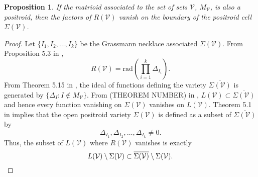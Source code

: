 \documentclass[11pt]{article}
\newcommand{\note}{\todo[color=green!40]}
\newcommand{\cP}{\mathcal{P}}
\newcommand{\cV}{\mathcal{V}}
\newcommand{\VP}{\cV(\cP)}
\newtheorem{prop}[thm]{Proposition}
\theoremstyle{remark}
\theoremstyle{definition}
\begin{document}
\begin{prop}\label{res:vanishonbdny} \note{changed all $\VP$ to $\cV$}
If the matrioid associated to the set of sets $\cV$, $M_{\cV}$, is also a positroid, then the factors of $R(\cV)$ vanish on the boundary of the positroid cell $\Sigma(\cV)$.
\end{prop}


\begin{proof}
Let $\{I_1, I_2, \dots, I_k\}$ be the Grassmann necklace associated $\Sigma(\cV)$. From Proposition 5.3 in \cite{generalcombinatoricsII},
%
\begin{displaymath}
R(\cV) = \mathrm{rad}\left(\prod_{i = 1}^{k} \Delta_{I_i}\right).
\end{displaymath}
%
From Theorem 5.15 in \cite{knutsonlamspeyerjuggling}, the ideal of functions defining the variety $\overline{\Sigma(\cV)}$ is generated by $\{\Delta_I : I \notin M_{\cV}\}$. From (THEOREM NUMBER) in \cite{basisshapeloci}, $L(\cV) \subset \overline{\Sigma(\cV)}$ and hence every function vanishing on $\Sigma(\cV)$ vanishes on $L(\cV)$. Theorem 5.1 in \cite{knutsonlamspeyerjuggling} implies that the open positroid variety $\Sigma(\cV)$ is defined as a subset of $\overline{\Sigma(\cV)}$ by
%
\begin{displaymath}
\Delta_{I_1}, \Delta_{I_2}, \dots, \Delta_{I_k} \neq 0.
\end{displaymath}
%
Thus, the subset of $L(\cV)$ where $R(\cV)$ vanishes is exactly
%
\begin{displaymath}
L(\cV) \setminus \Sigma(\cV) \subset \overline{\Sigma(\cV)} \setminus \Sigma(\cV). \qedhere
\end{displaymath}
\end{proof}
\end{document}
